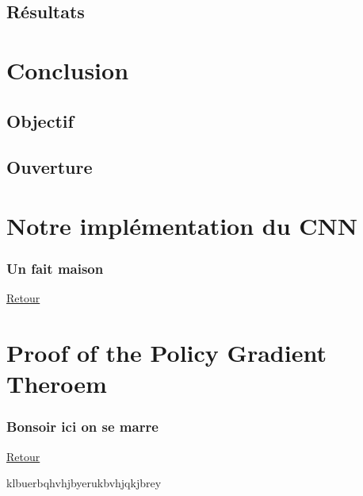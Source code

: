 \documentclass[8pt]{beamer}
\begin{document}
\subsection{Résultats}

\begin{frame}

\end{frame}

\section*{Conclusion}

\subsection{Objectif}

\subsection{Ouverture}

\appendix

\section*{Notre implémentation du CNN}

\begin{frame}[label=CNN]
  \frametitle{Un fait maison}
  \hyperlink{retourCNN}{Retour}
\end{frame}

\section*{Proof of the Policy Gradient Theroem}

\begin{frame}[label=demopolicygradient]
  \frametitle{Bonsoir ici on se marre}

  \hyperlink{policyintroduction}{Retour}
  
  klbuerbqhvhjbyerukbvhjqkjbrey
\end{frame}
\end{document}
